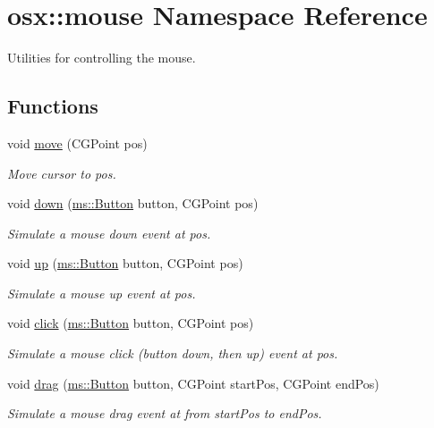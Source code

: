\hypertarget{namespaceosx_1_1mouse}{\section{osx\-:\-:mouse Namespace Reference}
\label{namespaceosx_1_1mouse}
}


Utilities for controlling the mouse.  


\subsection*{Functions}
\begin{DoxyCompactItemize}
\item 
void \hyperlink{namespaceosx_1_1mouse_a96fc2b2983c0d9ee610ca9404ccc0506}{move} (C\-G\-Point pos)
\begin{DoxyCompactList}\small\item\em Move cursor to {\ttfamily pos}. \end{DoxyCompactList}\item 
void \hyperlink{namespaceosx_1_1mouse_a8a25c1e4fda52095a4e113b2832777da}{down} (\hyperlink{namespacemouse_af85c842f9410a5f81fe933360fb19bc4}{ms\-::\-Button} button, C\-G\-Point pos)
\begin{DoxyCompactList}\small\item\em Simulate a mouse down event at {\ttfamily pos}. \end{DoxyCompactList}\item 
void \hyperlink{namespaceosx_1_1mouse_a40b06e2da73d0ee062a669cdbcd6e4ef}{up} (\hyperlink{namespacemouse_af85c842f9410a5f81fe933360fb19bc4}{ms\-::\-Button} button, C\-G\-Point pos)
\begin{DoxyCompactList}\small\item\em Simulate a mouse up event at {\ttfamily pos}. \end{DoxyCompactList}\item 
void \hyperlink{namespaceosx_1_1mouse_a127098ef29a5e3b824fdc2376e89f557}{click} (\hyperlink{namespacemouse_af85c842f9410a5f81fe933360fb19bc4}{ms\-::\-Button} button, C\-G\-Point pos)
\begin{DoxyCompactList}\small\item\em Simulate a mouse click (button down, then up) event at {\ttfamily pos}. \end{DoxyCompactList}\item 
void \hyperlink{namespaceosx_1_1mouse_a49c625169ee20a981c56b3accf095605}{drag} (\hyperlink{namespacemouse_af85c842f9410a5f81fe933360fb19bc4}{ms\-::\-Button} button, C\-G\-Point start\-Pos, C\-G\-Point end\-Pos)
\begin{DoxyCompactList}\small\item\em Simulate a mouse drag event at from {\ttfamily start\-Pos} to {\ttfamily end\-Pos}. \end{DoxyCompactList}\end{DoxyCompactItemize}


